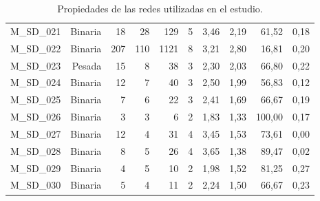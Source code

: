 \begin{table}[ht!]
\begin{tabular}{lrrrrrrrrr}
    M\_SD\_021 & Binaria & 18   & 28   & 129  & 5    & 3,46 & 2,19 & 61,52 & 0,18 \\
    M\_SD\_022 & Binaria & 207  & 110  & 1121 & 8    & 3,21 & 2,80 & 16,81 & 0,20 \\
    M\_SD\_023 & Pesada & 15   & 8    & 38   & 3    & 2,30 & 2,03 & 66,80 & 0,22 \\
    M\_SD\_024 & Binaria & 12   & 7    & 40   & 3    & 2,50 & 1,99 & 56,83 & 0,12 \\
    M\_SD\_025 & Binaria & 7    & 6    & 22   & 3    & 2,41 & 1,69 & 66,67 & 0,19 \\
    M\_SD\_026 & Binaria & 3    & 3    & 6    & 2    & 1,83 & 1,33 & 100,00 & 0,17 \\
    M\_SD\_027 & Binaria & 12   & 4    & 31   & 4    & 3,45 & 1,53 & 73,61 & 0,00 \\
    M\_SD\_028 & Binaria & 8    & 5    & 26   & 4    & 3,65 & 1,38 & 89,47 & 0,02 \\
    M\_SD\_029 & Binaria & 4    & 5    & 10   & 2    & 1,98 & 1,52 & 81,25 & 0,27 \\
    M\_SD\_030 & Binaria & 5    & 4    & 11   & 2    & 2,24 & 1,50 & 66,67 & 0,23 \\
    \bottomrule
    \end{tabular}%
    \caption{\label{table:table_results} Propiedades de las redes utilizadas en el estudio.}
\end{table}%


\clearpage
